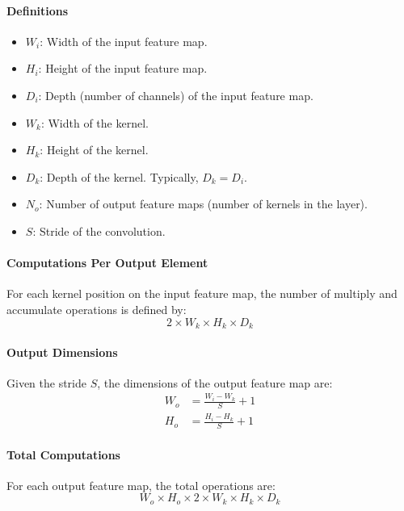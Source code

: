 \paragraph{Definitions}
\begin{itemize}
	\item \( W_i \): Width of the input feature map.
	\item \( H_i \): Height of the input feature map.
	\item \( D_i \): Depth (number of channels) of the input feature map.
	\item \( W_k \): Width of the kernel.
	\item \( H_k \): Height of the kernel.
	\item \( D_k \): Depth of the kernel. Typically, \( D_k = D_i \).
	\item \( N_o \): Number of output feature maps (number of kernels in the layer).
	\item \( S \): Stride of the convolution.
\end{itemize}

\paragraph{Computations Per Output Element}

For each kernel position on the input feature map, the number of multiply and accumulate operations is defined by:
\begin{equation}
2 \times W_k \times H_k \times D_k
\end{equation}

\paragraph{Output Dimensions}

Given the stride \( S \), the dimensions of the output feature map are:
\begin{align}
W_o &= \frac{W_i - W_k}{S} + 1 \\
H_o &= \frac{H_i - H_k}{S} + 1
\end{align}

\paragraph{Total Computations}

For each output feature map, the total operations are:
\begin{equation}
W_o \times H_o \times 2 \times W_k \times H_k \times D_k
\end{equation}

